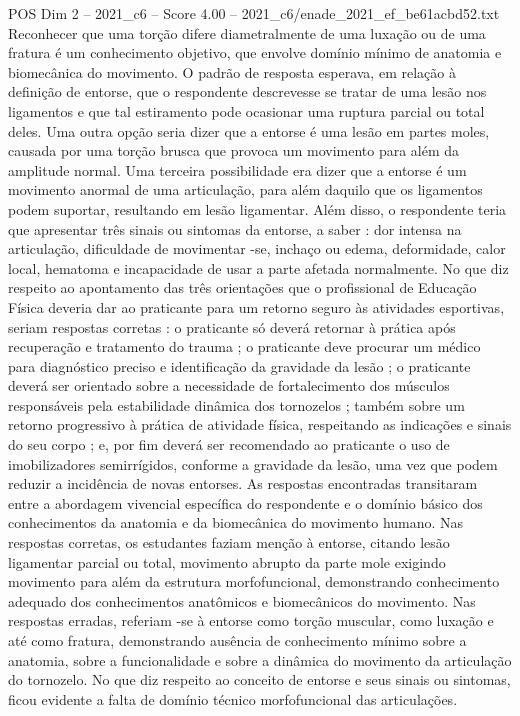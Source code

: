 \begin{textsample}{POS Dim 2 – 2021\_c6 – Score 4.00 – 2021\_c6/enade\_2021\_ef\_be61acbd52.txt}
Reconhecer que uma torção difere diametralmente de uma luxação ou de uma fratura é um conhecimento objetivo, que envolve domínio mínimo de anatomia e biomecânica do movimento.
O padrão de resposta esperava, em relação à definição de entorse, que o respondente descrevesse se tratar de uma lesão nos ligamentos e que tal estiramento pode ocasionar uma ruptura parcial ou total deles.
Uma outra opção seria dizer que a entorse é uma lesão em partes moles, causada por uma torção brusca que provoca um movimento para além da amplitude normal.
Uma terceira possibilidade era dizer que a entorse é um movimento anormal de uma articulação, para além daquilo que os ligamentos podem suportar, resultando em lesão ligamentar.
Além disso, o respondente teria que apresentar três sinais ou sintomas da entorse, a saber : dor intensa na articulação, dificuldade de movimentar -se, inchaço ou edema, deformidade, calor local, hematoma e incapacidade de usar a parte afetada normalmente.
No que diz respeito ao apontamento das três orientações que o profissional de Educação Física deveria dar ao praticante para um retorno seguro às atividades esportivas, seriam respostas corretas : o praticante só deverá retornar à prática após recuperação e tratamento do trauma ; o praticante deve procurar um médico para diagnóstico preciso e identificação da gravidade da lesão ; o praticante deverá ser orientado sobre a necessidade de fortalecimento dos músculos responsáveis pela estabilidade dinâmica dos tornozelos ; também sobre um retorno progressivo à prática de atividade física, respeitando as indicações e sinais do seu corpo ; e, por fim deverá ser recomendado ao praticante o uso de imobilizadores semirrígidos, conforme a gravidade da lesão, uma vez que podem reduzir a incidência de novas entorses.
As respostas encontradas transitaram entre a abordagem vivencial específica do respondente e o domínio básico dos conhecimentos da anatomia e da biomecânica do movimento humano.
Nas respostas corretas, os estudantes faziam menção à entorse, citando lesão ligamentar parcial ou total, movimento abrupto da parte mole exigindo movimento para além da estrutura morfofuncional, demonstrando conhecimento adequado dos conhecimentos anatômicos e biomecânicos do movimento.
Nas respostas erradas, referiam -se à entorse como torção muscular, como luxação e até como fratura, demonstrando ausência de conhecimento mínimo sobre a anatomia, sobre a funcionalidade e sobre a dinâmica do movimento da articulação do tornozelo.
No que diz respeito ao conceito de entorse e seus sinais ou sintomas, ficou evidente a falta de domínio técnico morfofuncional das articulações.

\end{textsample}
